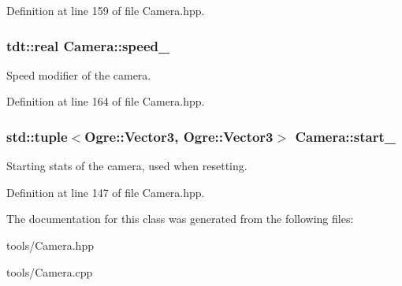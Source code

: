 Definition at line 159 of file Camera.\+hpp.

\subsubsection[{\texorpdfstring{speed\+\_\+}{speed_}}]{\setlength{\rightskip}{0pt plus 5cm}tdt\+::real Camera\+::speed\+\_\+\hspace{0.3cm}{\ttfamily [private]}}\hypertarget{class_camera_a08f8fa9c6bf80dcafe14d54787300ade}{}\label{class_camera_a08f8fa9c6bf80dcafe14d54787300ade}


Speed modifier of the camera. 



Definition at line 164 of file Camera.\+hpp.

\subsubsection[{\texorpdfstring{start\+\_\+}{start_}}]{\setlength{\rightskip}{0pt plus 5cm}std\+::tuple$<$Ogre\+::\+Vector3, Ogre\+::\+Vector3$>$ Camera\+::start\+\_\+\hspace{0.3cm}{\ttfamily [private]}}\hypertarget{class_camera_a050ad880982ac8d843b1b66dd6431170}{}\label{class_camera_a050ad880982ac8d843b1b66dd6431170}


Starting stats of the camera, used when resetting. 



Definition at line 147 of file Camera.\+hpp.



The documentation for this class was generated from the following files\+:\begin{DoxyCompactItemize}
\item 
tools/Camera.\+hpp\item 
tools/Camera.\+cpp\end{DoxyCompactItemize}
